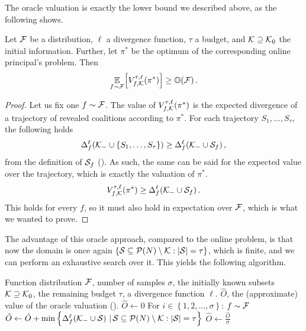 The oracle valuation is exactly the lower bound we described above, as the following  shows.

\begin{prop}
  \label{thm:online-bound-oracle}
  Let $ \mathcal{F} $ be a distribution, $ \ell $ a divergence function, $ \tau $ a budget, and $ \mathcal{K} \supseteq \mathcal{K}_0 $ the initial information.
  Further, let $ \pi^* $ be the optimum of the corresponding online principal's problem.
  Then \[
    \operatorname*{\mathbb{E}}_{f \sim \mathcal{F}}\!\left[ V^{\tau,\ell}_{f,\mathcal{K}}\!\left(\pi^*\right) \right] \geq \mathbb O\!\left(\mathcal{F}\right).
  \]
\end{prop}

\begin{proof}
  Let us fix one $ f \sim \mathcal{F} $.
  The value of $ V^{\tau,\ell}_{f,\mathcal{K}}\!\left(\pi^*\right) $ is the expected divergence of a trajectory of revealed coalitions according to $ \pi^* $.
  For each trajectory $ S_1, \ldots, S_\tau $, the following holds \[
    \Delta_{f}^{\ell}\!\left(\mathcal{K}_- \cup \left\{ S_1, \ldots, S_\tau \right\}\right) \geq \Delta_{f}^{\ell}\!\left(\mathcal{K}_- \cup \mathcal{S}_f\right),
  \]
  from the definition of $ \mathcal{S}_f $ ().
  As such, the same can be said for the expected value over the trajectory, which is exactly the valuation of $ \pi^* $. \[
    V^{\tau,\ell}_{f,\mathcal{K}}\!\left(\pi^*\right) \geq \Delta_{f}^{\ell}\!\left(\mathcal{K}_- \cup \mathcal{S}_f\right).
  \]
  This holds for every $ f $, so it must also hold in expectation over $ \mathcal{F} $, which is what we wanted to prove.
\end{proof}

The advantage of this oracle approach, compared to the online problem, is that now the domain is once again $ \left\{ \mathcal{S} \subseteq \mathcal{P}\!\left(N\right) \setminus \mathcal{K}: \left\lvert \mathcal{S} \right\rvert = \tau \right\} $, which is finite, and we can perform an exhaustive search over it.
This yields the following algorithm.

\begin{algor}{\algRO{}}{Function distribution $ \mathcal{F} $, number of samples $ \sigma $, the initially known subsets $ \mathcal{K} \supseteq \mathcal{K}_0 $, the remaining budget $ \tau $, a divergence function $ \ell $.}
  {$ \hat O $, the (approximate) value of the oracle valuation ().}
  \State $ \hat O \gets 0 $
  \Indent For $ i \in \left\{ 1, 2, \ldots, \sigma \right\} $:
    \State $ f \sim \mathcal{F} $
    \State $ \hat O \gets \hat O + \min \left\{ \Delta_{f}^{\ell}\!\left(\mathcal{K}_- \cup \mathcal{S}\right)  \,|\, \mathcal{S} \subseteq \mathcal{P}\!\left(N\right) \setminus \mathcal{K}: \left\lvert \mathcal{S} \right\rvert = \tau \right\} $
  \EndIndent
  \State $ \hat O \gets \frac{\hat O}{\sigma} $
\end{algor}

